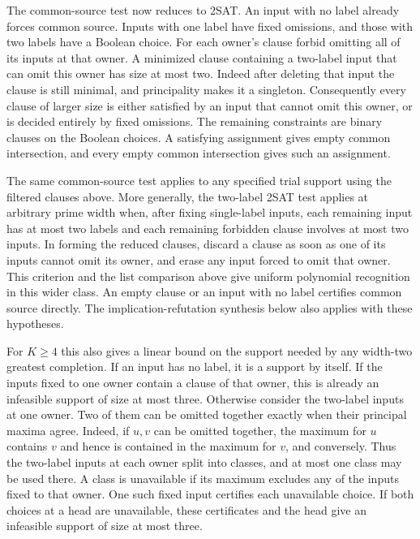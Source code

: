 The common-source test now reduces to 2SAT. An input
with no label already forces common source. Inputs with
one label have fixed omissions, and those with two
labels have a Boolean choice. For each owner's clause
forbid omitting all of its inputs at that owner. A
minimized clause containing a two-label input that can
omit this owner has size at most two. Indeed after
deleting that input the clause is still minimal, and
principality makes it a singleton. Consequently every
clause of larger size is either satisfied by an input
that cannot omit this owner, or is decided entirely by
fixed omissions. The remaining constraints are binary
clauses on the Boolean choices. A satisfying assignment
gives empty common intersection, and every empty common
intersection gives such an assignment.

The same common-source test applies to any specified
trial support using the filtered clauses above. More
generally, the two-label 2SAT test applies at arbitrary
prime width when, after fixing single-label inputs,
each remaining input has at most two labels and each
remaining forbidden clause involves at most two inputs.
In forming the reduced clauses, discard a clause as
soon as one of its inputs cannot omit its owner, and
erase any input forced to omit that owner. This
criterion and the list comparison above give uniform
polynomial recognition in this wider class. An empty
clause or an input with no label certifies common
source directly. The implication-refutation synthesis
below also applies with these hypotheses.

For $K\ge4$ this also gives a linear bound on the
support needed by any width-two greatest completion.
If an input has no label, it is a support by itself.
If the inputs fixed to one owner contain a clause of
that owner, this is already an infeasible support of
size at most three. Otherwise consider the two-label
inputs at one owner. Two of them can be omitted
together exactly when their principal maxima agree.
Indeed, if $u,v$ can be omitted together, the maximum
for $u$ contains $v$ and hence is contained in the
maximum for $v$, and conversely. Thus the two-label
inputs at each owner split into classes, and at most
one class may be used there. A class is unavailable
if its maximum excludes any of the inputs fixed to
that owner. One such fixed input certifies each
unavailable choice. If both choices at a head are
unavailable, these certificates and the head give
an infeasible support of size at most three.

